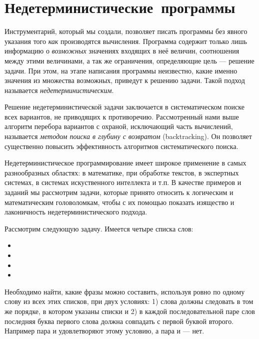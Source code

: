 \section{Недетерминисти\-чес\-кие~программы}%
Инструментарий, который мы создали, позволяет писать программы без явного указания того \emph{как} производятся вычисления. Программа содержит только лишь информацию о \emph{возможных} значениях входящих в неё величин, соотношения между этими величинами, а так же ограничения, определяющие цель --- решение задачи. При этом, на этапе написания программы неизвестно, какие именно значения из множества возможных, приведут к решению задачи. Такой подход называется \emph{недетерминистическим}.

Решение недетерминистической задачи заключается в систематическом поиске всех вариантов, не приводящих к противоречию. Рассмотренный нами выше алгоритм перебора вариантов с охраной, исключающий часть вычислений, называется \emph{методом поиска в глубину с возвратом} (backtracking). Он позволяет существенно повысить эффективность алгоритмов систематического поиска.

Недетерминистическое программирование имеет широкое применение в самых разнообразных областях: в математике, при обработке текстов, в экспертных системах, в системах искуственного интеллекта и т.п. В качестве примеров и заданий мы рассмотрим задачи, которые принято относить к логическим и математическим головоломкам, чтобы с их помощью показать изящество и лаконичность недетерминистического подхода.

Рассмотрим следующую задачу. Имеется четыре списка слов:

\begin{itemize}
  \item {}
  \item {}
  \item {}
  \item {}
\end{itemize}

Необходимо найти, какие фразы можно составить, используя ровно по одному слову из всех этих списков, при двух условиях: 1) слова должны следовать в том же порядке, в котором указаны списки и 2) в каждой последовательной паре слов последняя буква первого слова должна совпадать с первой буквой второго. Например пара  и  удовлетворяют этому условию, а пара  и  --- нет. 


